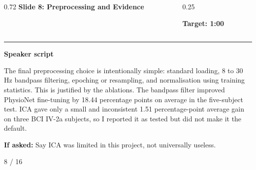 \documentclass[aspectratio=169,10pt]{beamer}
\begin{document}
\begin{frame}[plain]
\vspace*{0.16cm}
\begin{columns}[T,totalwidth=\textwidth]
\begin{column}{0.72\textwidth}
{\fontsize{17}{18.5}\selectfont\bfseries Slide 8: Preprocessing and Evidence}
\end{column}
\begin{column}{0.25\textwidth}
\raggedleft
\colorbox{noteCream}{\parbox{0.88\linewidth}{\centering\bfseries Target: 1:00}}
\end{column}
\end{columns}
\vspace{0.10cm}
{\color{uomPurple}\rule{\textwidth}{1.2pt}}
\vspace{0.18cm}
{\color{uomPurple}\bfseries Speaker script}
\vspace{0.06cm}
\setlength{\fboxsep}{6pt}
\noindent\colorbox{panelGrey}{\begin{minipage}{0.94\textwidth}
\justifying\fontsize{11.0}{13.4}\selectfont
The final preprocessing choice is intentionally simple: standard loading, 8 to 30 Hz bandpass filtering, epoching or resampling, and normalisation using training statistics. This is justified by the ablations. The bandpass filter improved PhysioNet fine-tuning by 18.44 percentage points on average in the five-subject test. ICA gave only a small and inconsistent 1.51 percentage-point average gain on three BCI IV-2a subjects, so I reported it as tested but did not make it the default.
\end{minipage}}
\vspace{0.22cm}
\noindent\colorbox{noteCream}{\begin{minipage}{0.94\textwidth}
\fontsize{9.6}{11.6}\selectfont
{\bfseries If asked:} Say ICA was limited in this project, not universally useless.
\end{minipage}}
\vfill
\hfill{\color{textDark}\scriptsize 8 / 16}
\end{frame}
\end{document}
